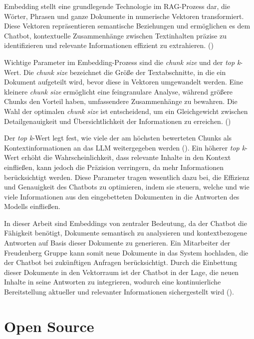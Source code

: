 Embedding stellt eine grundlegende Technologie im \ac{RAG}-Prozess dar, die Wörter, Phrasen und ganze Dokumente in numerische Vektoren transformiert. 
Diese Vektoren repräsentieren semantische Beziehungen und ermöglichen es dem Chatbot, kontextuelle Zusammenhänge zwischen Textinhalten präzise zu identifizieren und relevante Informationen effizient zu extrahieren. (\cite[S. 1 ff.]{tennenholtz2024})

Wichtige Parameter im Embedding-Prozess sind die \textit{chunk size} und der \textit{top k}-Wert. Die \textit{chunk size} bezeichnet die Größe der Textabschnitte, in die ein Dokument aufgeteilt wird, 
bevor diese in Vektoren umgewandelt werden. Eine kleinere \textit{chunk size} ermöglicht eine feingranulare Analyse, während größere Chunks den Vorteil haben, umfassendere Zusammenhänge zu bewahren. 
Die Wahl der optimalen \textit{chunk size} ist entscheidend, um ein Gleichgewicht zwischen Detailgenauigkeit und Übersichtlichkeit der Informationen zu erreichen. (\cite[S. 1329 ff.]{Abdelazim2023})

Der \textit{top k}-Wert legt fest, wie viele der am höchsten bewerteten Chunks als Kontextinformationen an das \ac{LLM} weitergegeben werden (\cite{llamaindex}). Ein höherer \textit{top k}-Wert erhöht die Wahrscheinlichkeit, 
dass relevante Inhalte in den Kontext einfließen, kann jedoch die Präzision verringern, da mehr Informationen berücksichtigt werden. 
Diese Parameter tragen wesentlich dazu bei, die Effizienz und Genauigkeit des Chatbots zu optimieren, indem sie steuern, 
welche und wie viele Informationen aus den eingebetteten Dokumenten in die Antworten des Modells einfließen.

In dieser Arbeit sind Embeddings von zentraler Bedeutung, da der Chatbot die Fähigkeit benötigt, Dokumente semantisch zu analysieren und kontextbezogene Antworten auf Basis dieser Dokumente zu generieren. 
Ein Mitarbeiter der Freudenberg Gruppe kann somit neue Dokumente in das System hochladen, die der Chatbot bei zukünftigen Anfragen berücksichtigt. 
Durch die Einbettung dieser Dokumente in den Vektorraum ist der Chatbot in der Lage, die neuen Inhalte in seine Antworten zu integrieren, 
wodurch eine kontinuierliche Bereitstellung aktueller und relevanter Informationen sichergestellt wird (\cite[S. 4]{akkiraju2024factsbuildingretrievalaugmented}).

\section{Open Source}

